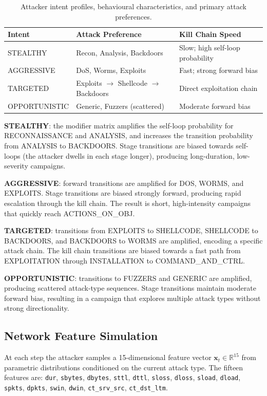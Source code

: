 \begin{table}[ht]
  \centering
  \caption{Attacker intent profiles, behavioural characteristics, and
           primary attack preferences.}
  \label{tab:intents_meth}
  \begin{tabular}{lll}
    \toprule
    Intent & Attack Preference & Kill Chain Speed \\
    \midrule
    STEALTHY      & Recon, Analysis, Backdoors    & Slow; high self-loop probability \\
    AGGRESSIVE    & DoS, Worms, Exploits          & Fast; strong forward bias \\
    TARGETED      & Exploits $\to$ Shellcode $\to$ Backdoors & Direct exploitation chain \\
    OPPORTUNISTIC & Generic, Fuzzers (scattered)  & Moderate forward bias \\
    \bottomrule
  \end{tabular}
\end{table}

\textbf{STEALTHY}: the modifier matrix amplifies the self-loop probability
for RECONNAISSANCE and ANALYSIS, and increases the transition probability
from ANALYSIS to BACKDOORS.
Stage transitions are biased towards self-loops (the attacker dwells in each
stage longer), producing long-duration, low-severity campaigns.

\textbf{AGGRESSIVE}: forward transitions are amplified for DOS, WORMS, and
EXPLOITS.
Stage transitions are biased strongly forward, producing rapid escalation
through the kill chain.
The result is short, high-intensity campaigns that quickly reach ACTIONS\_ON\_OBJ.

\textbf{TARGETED}: transitions from EXPLOITS to SHELLCODE, SHELLCODE to
BACKDOORS, and BACKDOORS to WORMS are amplified, encoding a specific attack
chain.
The kill chain transitions are biased towards a fast path from EXPLOITATION
through INSTALLATION to COMMAND\_AND\_CTRL.

\textbf{OPPORTUNISTIC}: transitions to FUZZERS and GENERIC are amplified,
producing scattered attack-type sequences.
Stage transitions maintain moderate forward bias, resulting in a campaign that
explores multiple attack types without strong directionality.

\subsection{Network Feature Simulation}
\label{sec:features}

At each step the attacker samples a 15-dimensional feature vector
$\mathbf{x}_t \in \mathbb{R}^{15}$ from parametric distributions conditioned
on the current attack type.
The fifteen features are:
\texttt{dur}, \texttt{sbytes}, \texttt{dbytes}, \texttt{sttl},
\texttt{dttl}, \texttt{sloss}, \texttt{dloss}, \texttt{sload},
\texttt{dload}, \texttt{spkts}, \texttt{dpkts}, \texttt{swin},
\texttt{dwin}, \texttt{ct\_srv\_src}, \texttt{ct\_dst\_ltm}.

